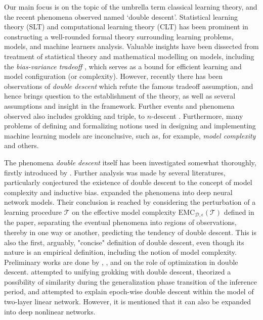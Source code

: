 \documentclass[twoside,10pt]{article}
\begin{document}
Our main focus is on the topic of the umbrella term classical learning theory, and the recent phenomena observed named `double descent'. Statistical learning theory (SLT) and computational learning theory (CLT) \cite{Vapnik1999-VAPTNO,10.5555/2371238,10.5555/2621980,STL_Hajek_Maxim_2021,bousquet2020theoryuniversallearning} has been prominent in constructing a well-rounded formal theory surrounding learning problems, models, and machine learners analysis. Valuable insights have been dissected from treatment of statistical theory and mathematical modelling on models, including the \textit{bias-variance tradeoff} \cite{6797087,Domingos2000AUB}, which serves as a bound for efficient learning and model configuration (or complexity). However, recently there has been observations of \textit{double descent} \cite{belkin_reconciling_2019,schaeffer_double_2023,nakkiran_deep_2019,lafon_understanding_2024} which refute the famous tradeoff assumption, and hence brings question to the establishment of the theory, as well as several assumptions and insight in the framework. Further events and phenomena observed also includes grokking and triple, to $n$-descent \cite{davies_unifying_2023,d_ascoli_triple_2020}. Furthermore, many problems of defining and formalizing notions used in designing and implementing machine learning models are inconclusive, such as, for example, \textit{model complexity} and others. 

The phenomena \textit{double descent} itself has been investigated somewhat thoroughly, firstly introduced by \cite{belkin_reconciling_2019}. Further analysis was made by several literatures, particularly conjectured the existence of double descent to the concept of model complexity and inductive bias. \cite{nakkiran_deep_2019} expanded the phenomena into deep neural network models. Their conclusion is reached by considering the perturbation of a learning procedure $\mathcal{T}$ on the effective model complexity $\mathrm{EMC}_{\mathcal{D},\epsilon}(\mathcal{T})$ defined in the paper, separating the eventual phenomena into regions of observations, thereby in one way or another, predicting the tendency of double descent. This is also the first, arguably, "concise" definition of double descent, even though its nature is an empirical definition, including the notion of model complexity. Preliminary works are done by \cite{lafon_understanding_2024}, \cite{schaeffer_double_2023}, and \cite{liu2023understandingroleoptimizationdouble} on the role of optimization in double descent. \cite{davies_unifying_2023} attempted to unifying grokking with double descent, theorized a possibility of similarity during the generalization phase transition of the inference period, and \cite{olmin2024understandingepochwisedoubledescent} attempted to explain epoch-wise double descent within the model of two-layer linear network. However, it is mentioned that it can also be expanded into deep nonlinear networks. 
\end{document}

